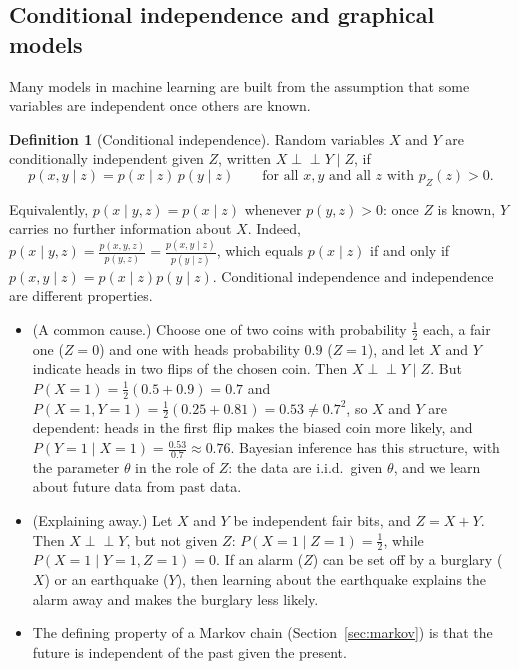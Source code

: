 \documentclass[11pt]{article}
\newcommand{\indep}{\perp\!\!\!\perp}
\theoremstyle{definition}
\newtheorem{definition}{Definition}[section]
\theoremstyle{plain}
\theoremstyle{remark}
\begin{document}
\subsection{Conditional independence and graphical models}\label{sec:conditional-independence}

Many models in machine learning are built from the assumption that some variables are independent once others are known.

\begin{definition}[Conditional independence]\label{def:conditional-independence}
    Random variables $X$ and $Y$ are conditionally independent given $Z$, written $X \indep Y \mid Z$, if
    \[p(x, y \mid z) = p(x \mid z)\,p(y \mid z) \qquad \text{for all } x, y \text{ and all } z \text{ with } p_Z(z) > 0.\]
\end{definition}

Equivalently, $p(x \mid y, z) = p(x \mid z)$ whenever $p(y, z) > 0$: once $Z$ is known, $Y$ carries no further information about $X$. Indeed, $p(x \mid y, z) = \frac{p(x, y, z)}{p(y, z)} = \frac{p(x, y \mid z)}{p(y \mid z)}$, which equals $p(x \mid z)$ if and only if $p(x, y \mid z) = p(x \mid z)p(y \mid z)$. Conditional independence and independence are different properties.
\begin{itemize}
    \item (A common cause.) Choose one of two coins with probability $\frac{1}{2}$ each, a fair one ($Z = 0$) and one with heads probability $0.9$ ($Z = 1$), and let $X$ and $Y$ indicate heads in two flips of the chosen coin. Then $X \indep Y \mid Z$. But $P(X = 1) = \frac{1}{2}(0.5 + 0.9) = 0.7$ and $P(X = 1, Y = 1) = \frac{1}{2}(0.25 + 0.81) = 0.53 \neq 0.7^2$, so $X$ and $Y$ are dependent: heads in the first flip makes the biased coin more likely, and $P(Y = 1 \mid X = 1) = \frac{0.53}{0.7} \approx 0.76$. Bayesian inference has this structure, with the parameter $\theta$ in the role of $Z$: the data are i.i.d.\ given $\theta$, and we learn about future data from past data.
    \item (Explaining away.) Let $X$ and $Y$ be independent fair bits, and $Z = X + Y$. Then $X \indep Y$, but not given $Z$: $P(X = 1 \mid Z = 1) = \frac{1}{2}$, while $P(X = 1 \mid Y = 1, Z = 1) = 0$. If an alarm ($Z$) can be set off by a burglary ($X$) or an earthquake ($Y$), then learning about the earthquake explains the alarm away and makes the burglary less likely.
    \item The defining property of a Markov chain (Section~\ref{sec:markov}) is that the future is independent of the past given the present.
\end{itemize}
\end{document}

